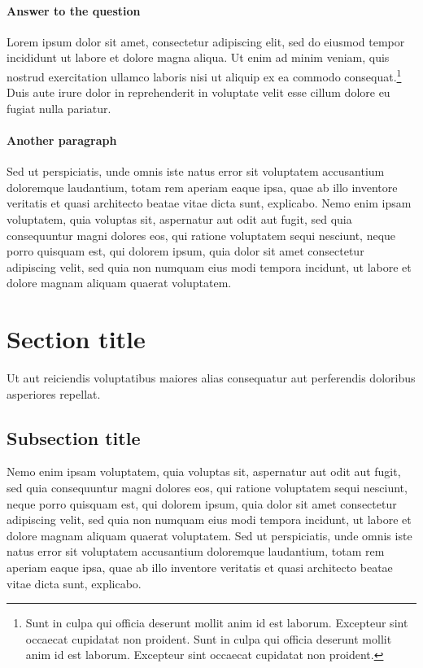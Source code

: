 \documentclass[letterpaper,12pt,leqno]{article}
\begin{document}
\paragraph{Answer to the question} Lorem ipsum dolor sit amet, consectetur adipiscing elit, sed do eiusmod tempor incididunt ut labore et dolore magna aliqua. Ut enim ad minim veniam, quis nostrud exercitation ullamco laboris nisi ut aliquip ex ea commodo consequat.\footnote{Sunt in culpa qui officia deserunt mollit anim id est laborum. Excepteur sint occaecat cupidatat non proident. Sunt in culpa qui officia deserunt mollit anim id est laborum. Excepteur sint occaecat cupidatat non proident.} Duis aute irure dolor in reprehenderit in voluptate velit esse cillum dolore eu fugiat nulla pariatur. 

\paragraph{Another paragraph} Sed ut perspiciatis, unde omnis iste natus error sit voluptatem accusantium doloremque laudantium, totam rem aperiam eaque ipsa, quae ab illo inventore veritatis et quasi architecto beatae vitae dicta sunt, explicabo. Nemo enim ipsam voluptatem, quia voluptas sit, aspernatur aut odit aut fugit, sed quia consequuntur magni dolores eos, qui ratione voluptatem sequi nesciunt, neque porro quisquam est, qui dolorem ipsum, quia dolor sit amet consectetur adipiscing velit, sed quia non numquam eius modi tempora incidunt, ut labore et dolore magnam aliquam quaerat voluptatem.

\section{Section title}\label{s:section}

Ut aut reiciendis voluptatibus maiores alias consequatur aut perferendis doloribus asperiores repellat. 

\subsection{Subsection title}

Nemo enim ipsam voluptatem, quia voluptas sit, aspernatur aut odit aut fugit, sed quia consequuntur magni dolores eos, qui ratione voluptatem sequi nesciunt, neque porro quisquam est, qui dolorem ipsum, quia dolor sit amet consectetur adipiscing velit, sed quia non numquam eius modi tempora incidunt, ut labore et dolore magnam aliquam quaerat voluptatem. Sed ut perspiciatis, unde omnis iste natus error sit voluptatem accusantium doloremque laudantium, totam rem aperiam eaque ipsa, quae ab illo inventore veritatis et quasi architecto beatae vitae dicta sunt, explicabo. 
\end{document}
